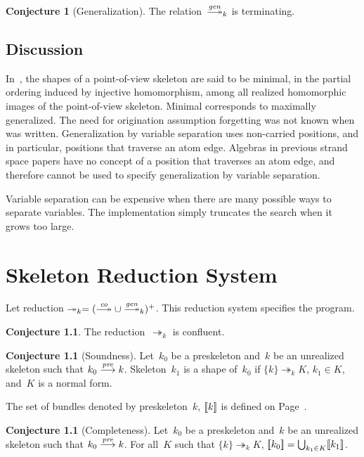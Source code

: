 \documentclass[12pt]{report}
\theoremstyle{definition}
\newtheorem{conj}[thm]{Conjecture}
\begin{document}
\begin{conj}[Generalization]
The relation~$\setreduction{\fn{gen}}_k$ is terminating.
\end{conj}

\section*{Discussion}
In~\cite{DoghmiGuttmanThayer07}, the shapes of a point-of-view
skeleton are said to be minimal, in the partial ordering induced by
injective homomorphism, among all realized homomorphic images of the
point-of-view skeleton.  Minimal corresponds to maximally generalized.
The need for origination assumption forgetting was not known
when~\cite{DoghmiGuttmanThayer07} was written.  Generalization by
variable separation uses non-carried positions, and in particular,
positions that traverse an atom edge.  Algebras in previous strand
space papers have no concept of a position that traverses an atom
edge, and therefore cannot be used to specify generalization by
variable separation.

Variable separation can be expensive when there are many possible ways
to separate variables.  The implementation simply truncates the search
when it grows too large.

\chapter{Skeleton Reduction System}\label{chp:skeleton reduction}

Let reduction
$\twoheadrightarrow_k=(\setreduction{\fn{co}}\cup
\setreduction{\fn{gen}}_k)^+$.  This reduction system specifies the
{\cpsa} program.

\begin{conj}
The reduction~$\twoheadrightarrow_k$ is confluent.
\end{conj}

\begin{conj}[Soundness]\label{cnj:soundness}
Let~$k_0$ be a preskeleton and~$k$ be an unrealized skeleton such that
$k_0\stackrel{\operatorname{\mathit{pre}}}{\longrightarrow}k$.  Skeleton~$k_1$ is a shape of~$k_0$ if
$\{k\}\twoheadrightarrow_k K$, $k_1\in K$, and~$K$ is a normal form.
\end{conj}

The set of bundles denoted by preskeleton~$k$, $[\![k]\!]$ is
defined on Page~\pageref{def:preskeleton denotation}.

\begin{conj}[Completeness]\label{cnj:completeness}
Let~$k_0$ be a preskeleton and~$k$ be an unrealized skeleton such that
$k_0\stackrel{\operatorname{\mathit{pre}}}{\longrightarrow}k$.  For all~$K$ such that $\{k\}\twoheadrightarrow_k
K$, $[\![k_0]\!]=\bigcup_{k_1\in K}[\![k_1]\!]$.
\end{conj}
\end{document}
